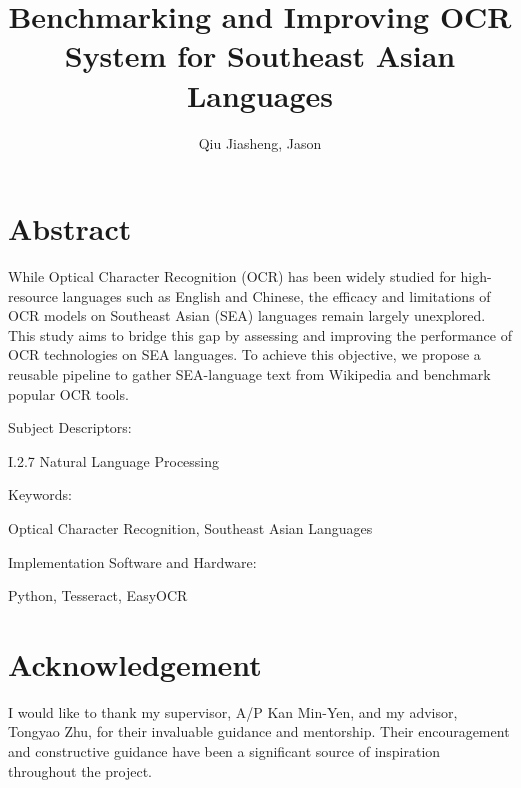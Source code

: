 \documentclass[12pt,oneside]{memoir}
\title{Benchmarking and Improving OCR System for Southeast Asian Languages}
\author{Qiu Jiasheng, Jason}
\begin{document}
\frontmatter

\pagestyle{plain}

\makecover

\setcounter{page}{1}

\maketitle

\chapter{Abstract}
While Optical Character Recognition (OCR) has been widely studied for high-resource languages such as English and Chinese, the efficacy and limitations of OCR models on Southeast Asian (SEA) languages remain largely unexplored.
This study aims to bridge this gap by assessing and improving the performance of OCR technologies on SEA languages.
To achieve this objective, we propose a reusable pipeline to gather SEA-language text from Wikipedia and benchmark popular OCR tools.

\vspace{0.3in}
Subject Descriptors:
\begin{adjustwidth}{0.7in}{}
    I.2.7 Natural Language Processing
\end{adjustwidth}

Keywords:
\begin{adjustwidth}{0.7in}{}
    Optical Character Recognition, Southeast Asian Languages
\end{adjustwidth}

Implementation Software and Hardware:
\begin{adjustwidth}{0.7in}{}
    Python, Tesseract, EasyOCR
\end{adjustwidth}

\chapter{Acknowledgement}
I would like to thank my supervisor, A/P Kan Min-Yen, and my advisor, Tongyao Zhu, for their invaluable guidance and mentorship. Their encouragement and constructive guidance have been a significant source of inspiration throughout the project.

\listoftables

\tableofcontents

\mainmatter
\end{document}
